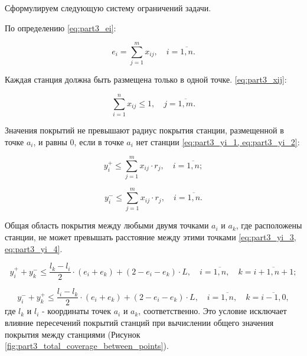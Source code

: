 
Сформулируем следующую систему ограничений задачи.

По определению \cref{eq:part3_ei}:

\begin{equation}
  \label{eq:part3_ei}
  e_i =  \sum\limits_{j=1}^m x_{ij}, \quad i = \overline{1,n}. 
\end{equation}

Каждая станция должна быть размещена только в одной точке. \cref{eq:part3_xij}:

\begin{equation}
  \label{eq:part3_xij}
  \sum\limits_{i=1}^n x_{ij} \leq 1, \quad j = \overline{1,m}. 
\end{equation}

Значения покрытий не превышают радиус покрытия станции, размещенной в точке $ a_i $, и равны 0, если в точке $a_i$  нет станции \cref{eq:part3_yi_1, eq:part3_yi_2}:


\begin{equation}
  \label{eq:part3_yi_1}
  y_i^+ \leq \sum\limits_{j=1}^m x_{ij} \cdot r_j, \quad i = \overline{1,n};
\end{equation}

\begin{equation}
  \label{eq:part3_yi_2}
  y_i^- \leq \sum\limits_{j=1}^m x_{ij} \cdot r_j, \quad i = \overline{1,n}. 
\end{equation}

Общая область покрытия между любыми двумя точками $ a_i $ и $ a_k $, где расположены станции, не может превышать расстояние между этими точками \cref{eq:part3_yi_3, eq:part3_yi_4}.

\begin{equation}
  \label{eq:part3_yi_3}
  y_i^+ + y_k^- \leq \frac{l_k - l_i}{2} \cdot (e_i + e_k ) + (2 - e_i - e_k ) \cdot L, \quad i = \overline{1,n},  \quad k = \overline{i+1,n+1};
\end{equation}

\begin{equation}
  \label{eq:part3_yi_4}
  y_i^- + y_k^+  \leq \frac{l_i-l_k}{2} \cdot (e_i + e_k) + (2 - e_i - e_k) \cdot L, \quad i = \overline{1,n}, \quad k = \overline{i-1,0},
\end{equation}
где $ l_k $ и $ l_i $ - координаты точек $ a_i $ и $ a_k $, соответственно. Это условие исключает влияние пересечений покрытий станций при вычислении общего значения покрытия между станциями (Рисунок \cref{fig:part3_total_coverage_between_points}).

